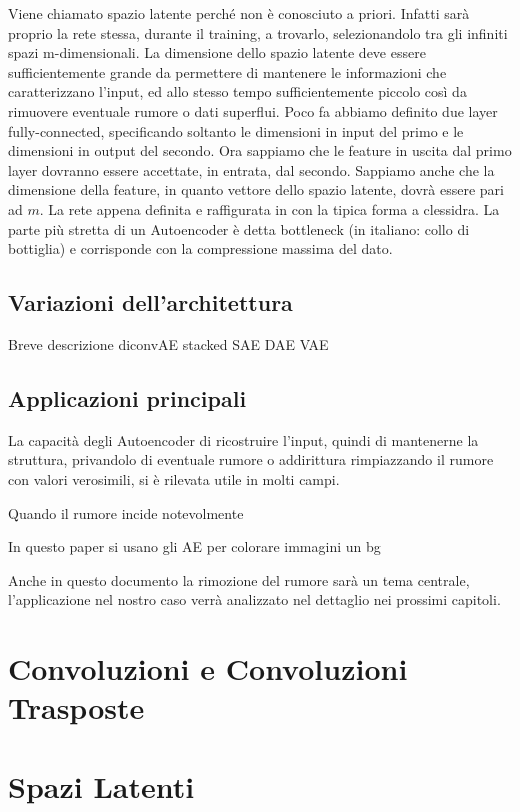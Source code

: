 Viene chiamato spazio latente perché non è conosciuto a priori.
Infatti sarà proprio la rete stessa, durante il training, a trovarlo, selezionandolo tra gli infiniti spazi m-dimensionali.
La dimensione dello spazio latente deve essere sufficientemente grande da permettere di mantenere le informazioni che caratterizzano l'input, ed allo stesso tempo sufficientemente piccolo così da rimuovere eventuale rumore o dati superflui.
Poco fa abbiamo definito due layer fully-connected, specificando soltanto le dimensioni in input del primo e le dimensioni in output del secondo.
Ora sappiamo che le feature in uscita dal primo layer dovranno essere accettate, in entrata, dal secondo.
Sappiamo anche che la dimensione della feature, in quanto vettore dello spazio latente, dovrà essere pari ad $m$.
La rete appena definita e raffigurata in %
con la tipica forma a clessidra.
La parte più stretta di un Autoencoder è detta bottleneck (in italiano: collo di bottiglia) e corrisponde con la compressione massima del dato.


\subsection{Variazioni dell'architettura}
Breve descrizione diconvAE stacked SAE DAE VAE


\subsection{Applicazioni principali}

La capacità degli Autoencoder di ricostruire l'input, quindi di mantenerne la struttura, privandolo di eventuale rumore o addirittura rimpiazzando il rumore con valori verosimili, si è rilevata utile in molti campi.

Quando il rumore incide notevolmente

In questo paper si usano gli AE per colorare immagini un bg

Anche in questo documento la rimozione del rumore sarà un tema centrale, l'applicazione nel nostro caso verrà analizzato nel dettaglio nei prossimi capitoli.









\section {Convoluzioni e Convoluzioni Trasposte}
\section {Spazi Latenti}

